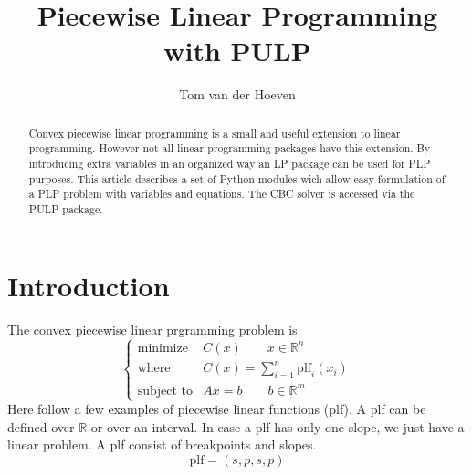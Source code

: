 \documentclass[]{article}
\title{Piecewise Linear Programming with PULP}
\author{Tom van der Hoeven}
\DeclareMathOperator*{\minimize}{minimize}
\newcommand{\field}[1]{\mathbb{#1}}
\newcommand{\R}{\field{R}}
\begin{document}
\maketitle

\begin{abstract} \noindent
Convex piecewise linear programming is a small and useful extension to linear programming.
However not all linear programming packages have this extension.
By introducing extra variables in an organized way an LP package can be used for PLP purposes.
This article describes a set of Python modules wich allow easy formulation
of a PLP problem with variables and equations.
The CBC solver is accessed via the PULP package.
\end{abstract}

\section{Introduction}
The convex piecewise linear prgramming problem is
\[ \begin{cases}
         \minimize          & C(x) \quad \quad x \in \R^n \\
         \text{where}       & C(x) = \sum_{i=1}^{n} \text{plf}_i(x_i) \\
         \text{subject to}  & Ax=b \quad \quad b \in \R^m
   \end{cases} \]
Here follow a few examples of piecewise linear functions (plf).
A plf can be defined over $\R$ or over an interval. In case a plf has only one slope,
we just have a linear problem. A plf consist of breakpoints and slopes. 
\[ \text{plf} = ( s, p, s, p)\]

\newcommand{\fxy}[1]
{
  \draw (0,0)  (5,0) node(xline) {} ;
  \foreach \i [evaluate={\pl=int(\i-1);\pr=int(\i+1);}] in #1 %
  \ifodd \i %
       { \draw[gray,very thin] (p\i) -- (p\i |- xline) node[black,below] {$p_\i$} ;}
     \else %
       { \draw (p\pl) -- (p\pr) node[sloped, midway, above] {$s_\i$} ;}
     \fi
;}
%
%
\end{document}
